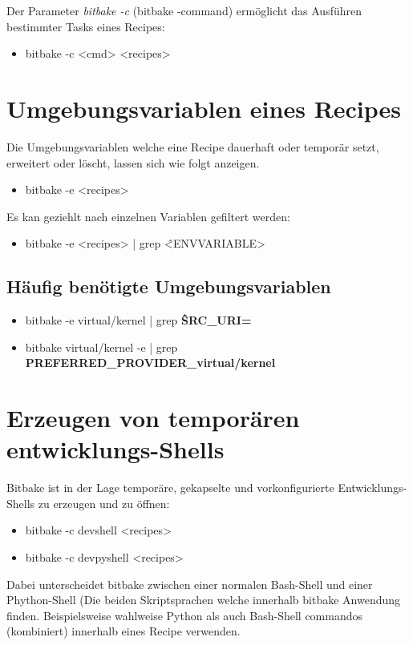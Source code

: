 Der Parameter \textit{bitbake -c} (bitbake -command) ermöglicht das Ausführen
bestimmter Tasks eines Recipes:

\begin{itemize}
    \item bitbake -c <cmd> <recipes>
\end{itemize}


\section{Umgebungsvariablen eines Recipes}%
\label{sec:umgebungsvariablen_eines_recipes}
Die Umgebungsvariablen welche eine Recipe dauerhaft oder temporär setzt,
erweitert oder löscht, lassen sich wie folgt anzeigen.
\begin{itemize}
    \item bitbake -e <recipes>
\end{itemize}

Es kan geziehlt nach einzelnen Variablen gefiltert werden:

\begin{itemize}
    \item bitbake -e <recipes> | grep \^<ENVVARIABLE>
\end{itemize}

\subsection{Häufig benötigte Umgebungsvariablen}%
\label{sub:haufig_gesucht_umgebungsvariablen}

\begin{itemize}
    \item bitbake -e virtual/kernel | grep \textbf{\^SRC\_URI=}
    \item bitbake virtual/kernel -e | grep \textbf{
            \glqq PREFERRED\_PROVIDER\_virtual/kernel\grqq}
\end{itemize}



\section{Erzeugen von temporären entwicklungs-Shells}%
\label{sec:temporaten_entwicklungs_shells}

Bitbake ist in der Lage temporäre, gekapselte und vorkonfigurierte
Entwicklungs-Shells zu erzeugen und zu öffnen:

\begin{itemize}
    \item bitbake -c devshell <recipes>
    \item bitbake -c devpyshell <recipes>
\end{itemize}

Dabei unterscheidet bitbake zwischen einer normalen Bash-Shell und einer
Phython-Shell (Die beiden Skriptsprachen welche innerhalb bitbake Anwendung
finden. Beispielsweise wahlweise Python als auch Bash-Shell commandos
(kombiniert) innerhalb eines Recipe verwenden.



